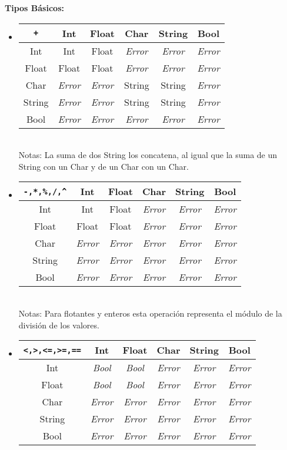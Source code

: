 \documentclass[12pt, spanish]{report}
\begin{document}
\textbf{Tipos B\'asicos:}
\begin{itemize}
\item
\begin{tabular}{|c||ccccc|}
	\hline
\texttt{+}  &  Int    &        Float & Char         &      String  & Bool  \\
	\hline \hline
Int    & Int          & Float        & \emph{Error} & \emph{Error} & \emph{Error} \\
Float  & Float        & Float        & \emph{Error} & \emph{Error} & \emph{Error}\\
Char   & \emph{Error} & \emph{Error} & String       & String       & \emph{Error}\\
String & \emph{Error} & \emph{Error} & String       & String       & \emph{Error}\\
Bool   & \emph{Error} & \emph{Error} & \emph{Error} & \emph{Error} & \emph{Error}\\
	\hline
\end{tabular}\\
Notas: La suma de dos String los concatena, al igual que la suma de un String
con un Char y de un Char con un Char.

\item
\begin{tabular}{|c||ccccc|}
	\hline
\texttt{-,*,\%,/,\^}  &  Int  & Float & Char  & String & Bool  \\
	\hline \hline
Int    & Int   & Float & \emph{Error} & \emph{Error} & \emph{Error}\\
Float  & Float & Float & \emph{Error} & \emph{Error} & \emph{Error}\\
Char   & \emph{Error} & \emph{Error} & \emph{Error} & \emph{Error} & \emph{Error} \\
String & \emph{Error} & \emph{Error} & \emph{Error} & \emph{Error} & \emph{Error} \\
Bool   & \emph{Error} & \emph{Error} & \emph{Error} & \emph{Error} & \emph{Error} \\
	\hline
\end{tabular}\\

Notas: Para flotantes y enteros esta operaci\'on representa el m\'odulo de la
divisi\'on de los valores.\\

\item
\begin{tabular}{|c||ccccc|}
	\hline
\texttt{<,>,<=,>=,==}&  Int  & Float & Char & String & Bool  \\
	\hline \hline
Int      &  \emph{Bool} &  \emph{Bool} & \emph{Error} & \emph{Error} & \emph{Error}\\
Float    &  \emph{Bool} &  \emph{Bool} & \emph{Error} & \emph{Error} & \emph{Error}\\
Char     & \emph{Error} & \emph{Error} & \emph{Error} & \emph{Error} & \emph{Error} \\
String   & \emph{Error} & \emph{Error} & \emph{Error} & \emph{Error} & \emph{Error} \\
Bool     & \emph{Error} & \emph{Error} & \emph{Error} & \emph{Error} & \emph{Error} \\
	\hline
\end{tabular}


\end{itemize}
\end{document}
